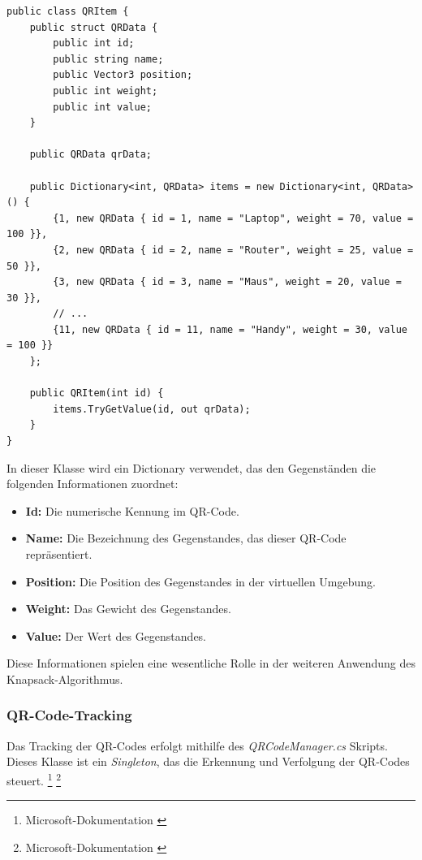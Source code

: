 \begin{itemize}
\begin{lstlisting}[style=csharp, caption={Codeabschnitt von QRItem Klasse}, label=code:update]
public class QRItem {
    public struct QRData {
        public int id;
        public string name;
        public Vector3 position;
        public int weight;
        public int value;
    }

    public QRData qrData;

    public Dictionary<int, QRData> items = new Dictionary<int, QRData>() {
        {1, new QRData { id = 1, name = "Laptop", weight = 70, value = 100 }},
        {2, new QRData { id = 2, name = "Router", weight = 25, value = 50 }},
        {3, new QRData { id = 3, name = "Maus", weight = 20, value = 30 }},
        // ...
        {11, new QRData { id = 11, name = "Handy", weight = 30, value = 100 }}
    };

    public QRItem(int id) {
        items.TryGetValue(id, out qrData);
    }
}
\end{lstlisting}

In dieser Klasse wird ein Dictionary verwendet, das den Gegenständen die folgenden Informationen zuordnet:

\begin{itemize}
    \item \textbf{Id:} Die numerische Kennung im QR-Code.
    \item \textbf{Name:} Die Bezeichnung des Gegenstandes, das dieser QR-Code repräsentiert.
    \item \textbf{Position:} Die Position des Gegenstandes in der virtuellen Umgebung.
    \item \textbf{Weight:} Das Gewicht des Gegenstandes.
    \item \textbf{Value:} Der Wert des Gegenstandes.
\end{itemize}

Diese Informationen spielen eine wesentliche Rolle in der weiteren Anwendung des Knapsack-Algorithmus.

\subsubsection{QR-Code-Tracking}
Das Tracking der QR-Codes erfolgt mithilfe des \textit{QRCodeManager.cs} Skripts. Dieses Klasse ist ein \textit{Singleton}, das
die Erkennung und Verfolgung der QR-Codes steuert. \footnote{Microsoft-Dokumentation \cite{Singleton}} \footnote{Microsoft-Dokumentation \cite{QR-Code-Tracking}}


\end{itemize}
